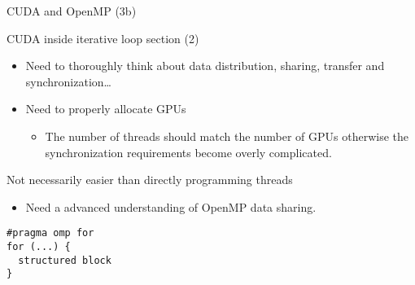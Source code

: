 \documentclass{beamer}
\begin{document}
\begin{frame}[containsverbatim]{CUDA and OpenMP (3b)}

CUDA inside iterative loop section (2)
\begin{itemize}
\item Need to thoroughly think about data distribution, sharing,
  transfer and synchronization\ldots
\item Need to properly allocate GPUs
  \begin{itemize}
  \item The number of threads should match the number of GPUs
    otherwise the synchronization requirements become overly complicated.
  \end{itemize}
\end{itemize}
Not necessarily easier than directly programming threads
\begin{itemize}
\item Need a advanced understanding of OpenMP data sharing.
\end{itemize}

\begin{lstlisting}
#pragma omp for
for (...) {
  structured block
}
\end{lstlisting}
\end{frame}
\end{document}
